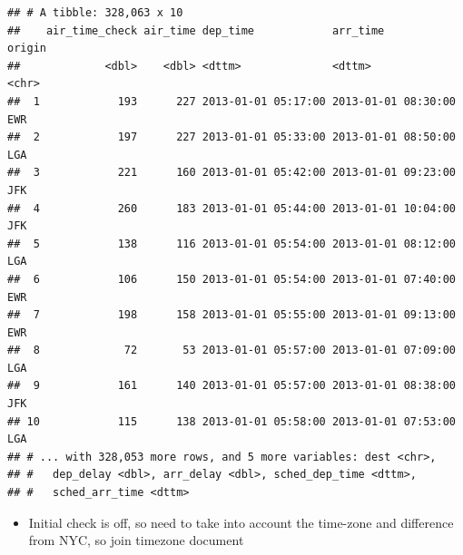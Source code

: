 \documentclass[]{book}
\newenvironment{Shaded}{\begin{snugshade}}{\end{snugshade}}
\newcommand{\DataTypeTok}[1]{\textcolor[rgb]{0.13,0.29,0.53}{#1}}
\newcommand{\DecValTok}[1]{\textcolor[rgb]{0.00,0.00,0.81}{#1}}
\newcommand{\KeywordTok}[1]{\textcolor[rgb]{0.13,0.29,0.53}{\textbf{#1}}}
\newcommand{\NormalTok}[1]{#1}
\newcommand{\OperatorTok}[1]{\textcolor[rgb]{0.81,0.36,0.00}{\textbf{#1}}}
\newcommand{\StringTok}[1]{\textcolor[rgb]{0.31,0.60,0.02}{#1}}
\providecommand{\tightlist}{%
  \setlength{\itemsep}{0pt}\setlength{\parskip}{0pt}}
\theoremstyle{definition}
\theoremstyle{definition}
\theoremstyle{definition}
\theoremstyle{remark}
\begin{document}
\begin{enumerate}
\begin{verbatim}
## # A tibble: 328,063 x 10
##    air_time_check air_time dep_time            arr_time            origin
##             <dbl>    <dbl> <dttm>              <dttm>              <chr> 
##  1            193      227 2013-01-01 05:17:00 2013-01-01 08:30:00 EWR   
##  2            197      227 2013-01-01 05:33:00 2013-01-01 08:50:00 LGA   
##  3            221      160 2013-01-01 05:42:00 2013-01-01 09:23:00 JFK   
##  4            260      183 2013-01-01 05:44:00 2013-01-01 10:04:00 JFK   
##  5            138      116 2013-01-01 05:54:00 2013-01-01 08:12:00 LGA   
##  6            106      150 2013-01-01 05:54:00 2013-01-01 07:40:00 EWR   
##  7            198      158 2013-01-01 05:55:00 2013-01-01 09:13:00 EWR   
##  8             72       53 2013-01-01 05:57:00 2013-01-01 07:09:00 LGA   
##  9            161      140 2013-01-01 05:57:00 2013-01-01 08:38:00 JFK   
## 10            115      138 2013-01-01 05:58:00 2013-01-01 07:53:00 LGA   
## # ... with 328,053 more rows, and 5 more variables: dest <chr>,
## #   dep_delay <dbl>, arr_delay <dbl>, sched_dep_time <dttm>,
## #   sched_arr_time <dttm>
\end{verbatim}

  \begin{itemize}
  \tightlist
  \item
    Initial check is off, so need to take into account the time-zone and
    difference from NYC, so join timezone document
  \end{itemize}

\begin{Shaded}
\end{Shaded}


\end{enumerate}
\end{document}
